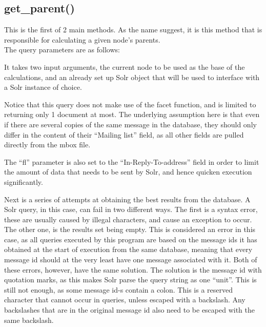 \documentclass[a4paper,english]{report}
\begin{document}
\subsection{get\_parent()}

This is the first of 2 main methods. As the name suggest, it is this method that is responsible for calculating a given node's parents.\\ 

The query parameters are as follows:









It takes two input arguments, the current node to be used as the base of the calculations, and an already set up Solr object that will be used to interface with a Solr instance of choice.



Notice that this query does not make use of the facet function, and is limited to returning only 1 document at most. The underlying assumption here is that even if there are several copies of the same message in the database, they should only differ in the content of their “Mailing list” field, as all other fields are pulled directly from the mbox file. 

The “fl” parameter is also set to the “In-Reply-To-address” field in order to limit the amount of data that needs to be sent by Solr, and hence quicken execution significantly.


Next is a series of attempts at obtaining the best results from the database.
A Solr query, in this case, can fail in two different ways. 
The first is a syntax error, these are usually caused by illegal characters, and cause an exception to occur.
The other one, is the results set being empty. This is considered an error in this case, as all queries executed by this program are based on the message ids it has obtained at the start of execution from the same database, meaning that every message id should at the very least have one message associated with it.
Both of these errors, however, have the same solution. The solution is the message id with quotation marks, as this makes Solr parse the query string as one “unit”. This is still not enough, as some message id-s contain a colon. This is a reserved character that cannot occur in queries, unless escaped with a  backslash.
Any backslashes that are in the original message id also need to be escaped with the same backslash.
\end{document}
